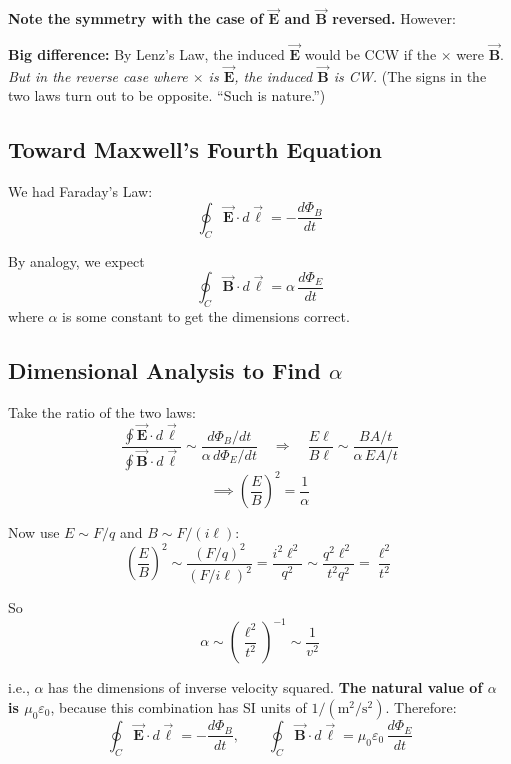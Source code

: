 \documentclass[11pt]{report}
\newcommand{\vbf}[1]{\vec{\mathbf{#1}}}
\begin{document}
\textbf{Note the symmetry with the case of $\vbf{E}$ and $\vbf{B}$ reversed.} However:

\textbf{Big difference:} By Lenz's Law, the induced $\vbf{E}$ would be CCW if the $\times$ were $\vbf{B}$. \emph{But in the reverse case where $\times$ is $\vbf{E}$, the induced $\vbf{B}$ is CW.} (The signs in the two laws turn out to be opposite. ``Such is nature.'')

\subsection{Toward Maxwell's Fourth Equation}

We had Faraday's Law:
\begin{equation}
\oint_C \vbf{E}\cdot d\vbf{\ell} = -\frac{d\Phi_B}{dt}
\end{equation}

By analogy, we expect
\begin{equation}
\oint_C \vbf{B}\cdot d\vbf{\ell} = \alpha\,\frac{d\Phi_E}{dt}
\end{equation}
where $\alpha$ is some constant to get the dimensions correct.

\subsection*{Dimensional Analysis to Find $\alpha$}

Take the ratio of the two laws:
\begin{equation}
\frac{\oint \vbf{E}\cdot d\vbf{\ell}}{\oint \vbf{B}\cdot d\vbf{\ell}} \sim \frac{d\Phi_B/dt}{\alpha\, d\Phi_E/dt} \quad \Longrightarrow \quad \frac{E\ell}{B\ell} \sim \frac{BA/t}{\alpha\, EA/t}
\end{equation}
\begin{equation}
\implies \left(\frac{E}{B}\right)^2 = \frac{1}{\alpha}
\end{equation}

Now use $E \sim F/q$ and $B \sim F/(i\ell)$:
\begin{equation}
\left(\frac{E}{B}\right)^2 \sim \frac{(F/q)^2}{(F/i\ell)^2} = \frac{i^2 \ell^2}{q^2} \sim \frac{q^2 \ell^2}{t^2 q^2} = \frac{\ell^2}{t^2}
\end{equation}

So
\begin{equation}
\alpha \sim \left(\frac{\ell^2}{t^2}\right)^{-1} \sim \frac{1}{v^2}
\end{equation}

i.e., $\alpha$ has the dimensions of inverse velocity squared. \textbf{The natural value of $\alpha$ is $\mu_0\varepsilon_0$}, because this combination has SI units of $1/(\text{m}^2/\text{s}^2)$. Therefore:
\begin{equation}
\boxed{\oint_C\vbf{E}\cdot d\vbf{\ell} = -\frac{d\Phi_B}{dt}, \qquad \oint_C\vbf{B}\cdot d\vbf{\ell} = \mu_0\varepsilon_0\,\frac{d\Phi_E}{dt}}
\end{equation}
\end{document}
